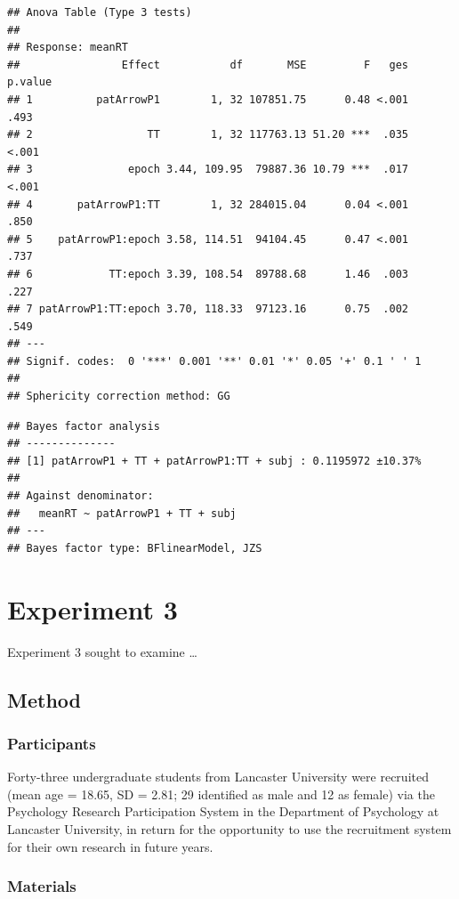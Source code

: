 \documentclass[
  man]{apa6}
\begin{document}
\begin{verbatim}
## Anova Table (Type 3 tests)
## 
## Response: meanRT
##                Effect           df       MSE         F   ges p.value
## 1          patArrowP1        1, 32 107851.75      0.48 <.001    .493
## 2                  TT        1, 32 117763.13 51.20 ***  .035   <.001
## 3               epoch 3.44, 109.95  79887.36 10.79 ***  .017   <.001
## 4       patArrowP1:TT        1, 32 284015.04      0.04 <.001    .850
## 5    patArrowP1:epoch 3.58, 114.51  94104.45      0.47 <.001    .737
## 6            TT:epoch 3.39, 108.54  89788.68      1.46  .003    .227
## 7 patArrowP1:TT:epoch 3.70, 118.33  97123.16      0.75  .002    .549
## ---
## Signif. codes:  0 '***' 0.001 '**' 0.01 '*' 0.05 '+' 0.1 ' ' 1
## 
## Sphericity correction method: GG
\end{verbatim}

\begin{verbatim}
## Bayes factor analysis
## --------------
## [1] patArrowP1 + TT + patArrowP1:TT + subj : 0.1195972 ±10.37%
## 
## Against denominator:
##   meanRT ~ patArrowP1 + TT + subj 
## ---
## Bayes factor type: BFlinearModel, JZS
\end{verbatim}

\hypertarget{experiment-3}{%
\section{Experiment 3}\label{experiment-3}}

Experiment 3 sought to examine \ldots{}

\hypertarget{method-2}{%
\subsection{Method}\label{method-2}}

\hypertarget{participants-2}{%
\subsubsection{Participants}\label{participants-2}}

Forty-three undergraduate students from Lancaster University were recruited (mean age = 18.65, SD = 2.81; 29 identified as male and 12 as female) via the Psychology Research Participation System in the Department of Psychology at Lancaster University, in return for the opportunity to use the recruitment system for their own research in future years.

\hypertarget{materials-2}{%
\subsubsection{Materials}\label{materials-2}}
\end{document}
